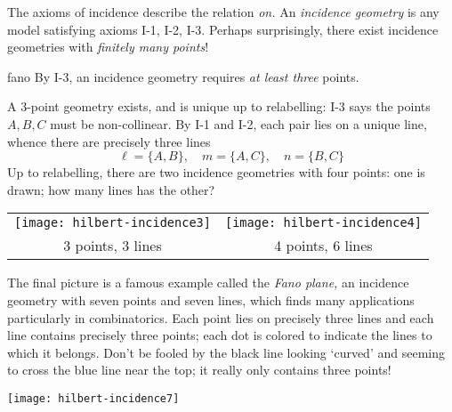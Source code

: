 \pagebreak



The axioms of incidence describe the relation \emph{on.} An \emph{incidence geometry} is any model satisfying axioms I-1, I-2, I-3. Perhaps surprisingly, there exist incidence geometries with \emph{finitely many points}!

\begin{examples}{}{fano}
	By I-3, an incidence geometry requires \emph{at least three} points.\par
	\begin{minipage}[t]{0.62\linewidth}\vspace{-5pt}
		A 3-point geometry exists, and is unique up to relabelling:\smallbreak
		I-3 says the points $A,B,C$ must be non-collinear. By I-1 and I-2, each pair lies on a unique line, whence there are precisely three lines
		\[
			\ell=\{A,B\},\quad m=\{A,C\},\quad n=\{B,C\}
		\]
		Up to relabelling, there are two incidence geometries with four points: one is drawn; how many lines has the other?
	\end{minipage}
	\hfill
	\begin{minipage}[t]{0.37\linewidth}\vspace{-15pt}
		\flushright
		\begin{tabular}{cc@{}}
			\texttt{[image: hilbert-incidence3]}
			&
			\texttt{[image: hilbert-incidence4]}\\
			3 points, 3 lines
			&
			4 points, 6 lines%
		\end{tabular}
	\end{minipage}
	\smallbreak
	\begin{minipage}[t]{0.72\linewidth}\vspace{0pt}
		The final picture is a famous example called the \emph{Fano plane,} an incidence geometry with seven points and seven lines, which finds many applications particularly in combinatorics. Each point lies on precisely three lines and each line contains precisely three points; each dot is colored to indicate the lines to which it belongs. Don't be fooled by the black line looking `curved' and seeming to cross the blue line near the top; it really only contains three points!
	\end{minipage}
	\hfill
	\begin{minipage}[t]{0.27\linewidth}\vspace{-17pt}
		\flushright
		\texttt{[image: hilbert-incidence7]}
	\end{minipage}
\end{examples}

